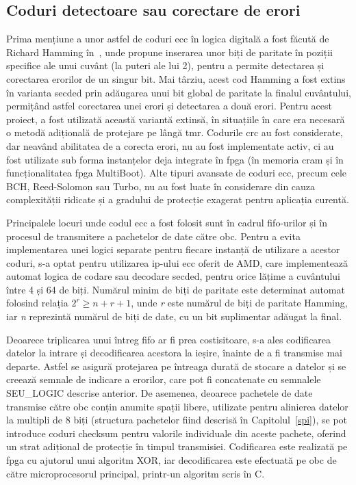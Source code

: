 \documentclass[12pt,a4paper]{report}
\begin{document}
\subsection{Coduri detectoare sau corectare de erori}
Prima mențiune a unor astfel de coduri \gls{ecc} în logica digitală a fost făcută de Richard Hamming în~\cite{hamming_book_ecc}, unde propune inserarea unor biți de paritate în poziții specifice ale unui cuvânt (la puteri ale lui 2), pentru a permite detectarea și corectarea erorilor de un singur bit. Mai târziu, acest cod Hamming a fost extins în varianta \gls{secded} prin adăugarea unui bit global de paritate la finalul cuvântului, permițând astfel corectarea unei erori și detectarea a două erori. Pentru acest proiect, a fost utilizată această variantă extinsă, în situațiile în care era necesară o metodă adițională de protejare pe lângă \gls{tmr}. Codurile \gls{crc} au fost considerate, dar neavând abilitatea de a corecta erori, nu au fost implementate activ, ci au fost utilizate sub forma instanțelor deja integrate în \gls{fpga} (în memoria \gls{cram} și în funcționalitatea \gls{fpga} MultiBoot). Alte tipuri avansate de coduri \gls{ecc}, precum cele BCH, Reed-Solomon sau Turbo, nu au fost luate în considerare din cauza complexității ridicate și a gradului de protecție exagerat pentru aplicația curentă.

Principalele locuri unde codul \gls{ecc} a fost folosit sunt în cadrul \gls{fifo}-urilor și în procesul de transmitere a pachetelor de date către \gls{obc}. Pentru a evita implementarea unei logici separate pentru fiecare instanță de utilizare a acestor coduri, s-a optat pentru utilizarea \gls{ip}-ului \gls{ecc} oferit de AMD, care implementează automat logica de codare sau decodare \gls{secded}, pentru orice lățime a cuvântului între 4 și 64 de biți. Numărul minim de biți de paritate este determinat automat folosind relația \(2^r \geq n + r + 1\), unde \textit{r} este numărul de biți de paritate Hamming, iar \textit{n} reprezintă numărul de biți de date, cu un bit suplimentar adăugat la final.

Deoarece triplicarea unui întreg \gls{fifo} ar fi prea costisitoare, s-a ales codificarea datelor la intrare și decodificarea acestora la ieșire, înainte de a fi transmise mai departe. Astfel se asigură protejarea pe întreaga durată de stocare a datelor și se creează semnale de indicare a erorilor, care pot fi concatenate cu semnalele SEU\_LOGIC descrise anterior. De asemenea, deoarece pachetele de date transmise către \gls{obc} conțin anumite spații libere, utilizate pentru alinierea datelor la multipli de 8 biți (structura pachetelor fiind descrisă în Capitolul~\ref{spi}), se pot introduce coduri checksum pentru valorile individuale din aceste pachete, oferind un strat adițional de protecție în timpul transmisiei. Codificarea este realizată pe \gls{fpga} cu ajutorul unui algoritm XOR, iar decodificarea este efectuată pe \gls{obc} de către microprocesorul principal, printr-un algoritm scris în C.
\end{document}
